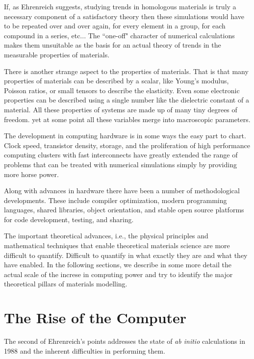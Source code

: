 If, as Ehrenreich suggests, studying trends in homologous materials 
is truly a necessary component of a satisfactory
theory then these simulations would have to be repeated 
over and over again, for every element in a group,
for each compound in a series, etc... The ``one-off" character of 
numerical calculations makes them unsuitable
as the basis for an actual theory of trends in the 
measurable properties of materials.

There is another strange aspect to the properties of materials.
That is that many properties of materials can be described by a scalar, 
like Young's modulus, Poisson ratios, 
or small tensors to describe the elasticity. 
Even some electronic properties can be described 
using a single number like the dielectric constant of a material.
All these properties of systems are made up of many tiny degrees of freedom.
yet at some point all these variables merge 
into macroscopic parameters.

The development in computing hardware is in some ways the easy part to chart. 
Clock speed, transistor density, storage, and the proliferation of high 
performance computing clusters with fast interconnects have greatly extended 
the range of problems that can be treated with numerical simulations
simply by providing more horse power.

Along with advances in hardware there have been a number
of methodological developments. These include compiler 
optimization, modern programming languages, 
shared libraries, object orientation, and stable open source 
platforms for code development, testing, and sharing. 

The important theoretical advances, i.e., the physical principles and
mathematical techniques that enable theoretical materials science 
are more difficult to quantify. Difficult to quantify in what exactly 
they are and what they have enabled. In the following sections, 
we describe in some more detail the actual scale 
of the increse in computing power and try to 
identify the major theoretical pillars of materials modelling.

\section{The Rise of the Computer}
\label{sec:riseofcomp}
The second of Ehrenreich's points addresses the state of
{\it ab initio} calculations in 1988 and
the inherent difficulties in performing them.

